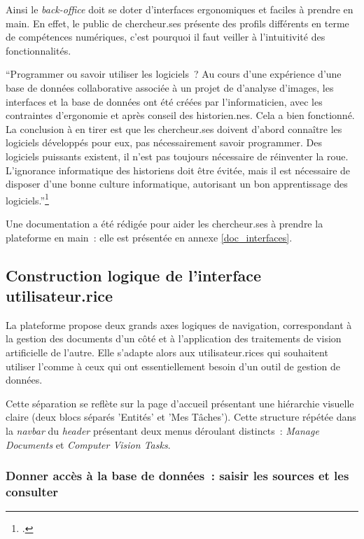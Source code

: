 Ainsi le \textit{back-office} doit se doter d'interfaces ergonomiques et faciles
à prendre en main. En effet, le public de chercheur.ses présente des profils
différents en terme de compétences numériques, c'est pourquoi il faut
veiller à l'intuitivité des
fonctionnalités.

\begin{kwote}
``Programmer ou savoir utiliser les logiciels~? Au cours d'une
expérience d'une base de données collaborative associée à un projet de
d'analyse d'images, les interfaces et la base de données ont été créées
par l'informaticien, avec les contraintes d'ergonomie et après conseil
des historien.nes. Cela a bien fonctionné. La conclusion à en tirer est que
les chercheur.ses doivent d'abord connaître les logiciels développés pour
eux, pas nécessairement savoir programmer. Des logiciels puissants
existent, il n'est pas toujours nécessaire de réinventer la roue.
L'ignorance informatique des historiens doit être évitée, mais il est
nécessaire de disposer d'une bonne culture informatique, autorisant un
bon apprentissage des logiciels.''\footcite[p.35]{clavert_lhistorien_2012}
\end{kwote}

Une documentation a été rédigée pour aider les chercheur.ses à prendre la
plateforme en main~: elle est présentée en annexe \ref{doc_interfaces}.

\hypertarget{construction-logique-de-linterface-utilisateur.rice}{%
\subsection{Construction logique de l'interface
utilisateur.rice}\label{construction-logique-de-linterface-utilisateur.rice}}

La plateforme propose deux grands axes logiques de navigation,
correspondant à la gestion des documents d'un côté et à l'application
des traitements de vision artificielle de l'autre. Elle s'adapte alors
aux utilisateur.rices qui souhaitent utiliser l'\ia comme à ceux qui ont
essentiellement besoin d'un outil de gestion de données.

Cette séparation se reflète sur la page d'accueil présentant une
hiérarchie visuelle claire (deux blocs séparés 'Entités' et 'Mes Tâches').
Cette structure répétée dans la \textit{navbar} du \textit{header} présentant deux menus
déroulant distincts~: \textit{Manage Documents} et \textit{Computer Vision Tasks}.

\hypertarget{donner-acces-a-la-base-de-donnees-saisir-les-sources-et-les-consulter}{%
\subsubsection{Donner accès à la base de données~: saisir les sources et les
consulter}\label{donner-acces-a-la-base-de-donnees-saisir-les-sources-et-les-consulter}}

